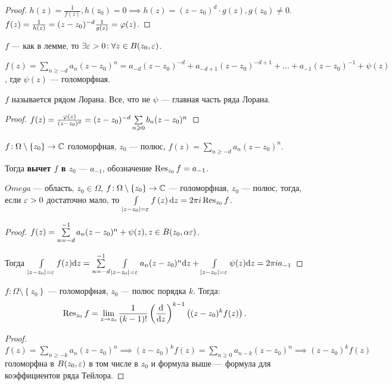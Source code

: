 \begin{proof}
   $h(z) = \frac{1}{f(z)}, h(z_0) = 0 \implies h(z) = (z-z_0)^{d} \cdot g(z), g(z_0) \neq 0$. $f(z) = \frac{1}{h(z)} = (z-z_0)^{-d} \frac{1}{g(z)} = \varphi(z)$.
\end{proof}
\begin{consequence}
    $f$ --- как в лемме, то  $\exists \varepsilon > 0\!: \forall z \in B(z_0, \varepsilon)$.

    $f(z) = \sum\limits_{n \ge -d} a_n (z-z_0)^n = a_{-d}(z-z_0)^{-d} + a_{-d + 1}(z-z_0)^{-d+1}+\ldots+a_{-1}(z-z_0)^{-1}+\psi(z)$, где $\psi(z)$ --- голоморфная.

    $f$ называется рядом Лорана. Все, что не  $\psi$ --- главная часть ряда Лорана.
\end{consequence}
\begin{proof}
    $f(z) = \frac{\varphi(z)}{(z-z_0)^d} = (z-z_0)^{-d} \sum\limits_{n \geqslant  0} b_n (z-z_0)^n$
\end{proof}
\begin{definition}
    $f\!: \Omega \setminus \left\{ z_0 \right\} \to \mathbb{C}$ голоморфная, $z_0$ --- полюс, $f(z) = \sum\limits_{n \ge  -d}a_n(z-z_0)^n$. 

    Тогда \textbf{вычет $f$ в  $z_0$} --- $a_{-1}$, обозначение $\operatorname{Res}_{z_0} f = a_{-1}$.
\end{definition}
\begin{lemma}
    $Omega$ --- область,  $z_0 \in \Omega$,  $f\!: \Omega \setminus \left\{ z_0 \right\} \to \mathbb{C}$ --- голоморфная, $z_0$ --- полюс, тогда, если $\varepsilon > 0$ достаточно мало, то  $\int\limits_{|z - z_0| = \varepsilon} f\left( z \right) \mathrm{d}z = 2 \pi i \operatorname{Res}_{z_0} f$.
\end{lemma}
\begin{proof}
    $f(z) = \sum\limits_{n = -d}^{-1} a_n (z-z_0)^n + \psi(z), z \in B(z_0, \alpha \varepsilon)$.

    Тогда $\int\limits_{\left| z-z_0 \right| = \varepsilon} f(z) \mathrm{d}z = \sum\limits_{n = -d}^{-1} \int\limits_{\left| z - z_0 \right| = \varepsilon}a_n(z-z_0)^n \mathrm{d}z + \int\limits_{\left| z-z_0 \right| = \varepsilon}\psi(z) \mathrm{d}z = 2 \pi i a_{-1}$
\end{proof}
\begin{lemma}
    $f\!: \Omega \setminus \left\{ z_0 \right\}$ --- голоморфная, $z_0$ --- полюс порядка $k$. Тогда:
     \[
         \operatorname{Res}_{z_0}f = \lim\limits_{z \to z_0} \frac{1}{(k-1)!}\left( \frac{\mathrm{d}}{\mathrm{d}z} \right)^{k-1}\left( (z-z_0)^k f(z) \right) 
    .\] 
\end{lemma}
\begin{proof}
    $f(z) = \sum\limits_{n \ge -k}a_n (z-z_0)^n \implies (z-z_0)^k f(z) = \sum\limits_{n \ge  0}a_{n - k}(z-z_0)^n \implies (z-z_0)^k f(z)$ голоморфна в $B(z_0, \varepsilon)$ в том числе в $z_0$ и формула выше --- формула для коэффициентов ряда Тейлора. 
\end{proof}
